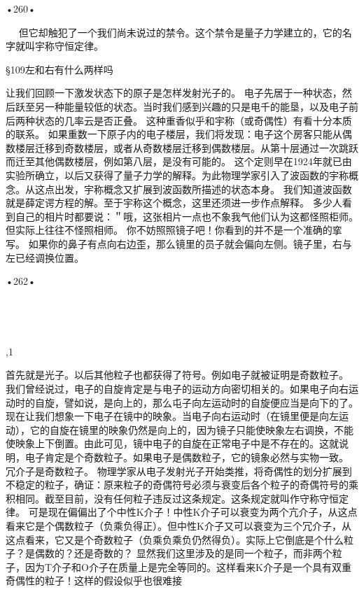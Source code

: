 •260•
  





  
但它却触犯了一个我们尚未说过的禁令。这个禁令是量子力学建立的，它的名字就叫宇称守恒定律。

§109左和右有什么两样吗

让我们回顾一下激发状态下的原子是怎样发射光子的。
电子先居于一种状态，然后跃至另一种能量较低的状态。当时我们感到兴趣的只是电千的能垦，以及电子前后两种状态的几率云是否正叠。
这种重香似乎和宇称（或奇偶性）有看十分本质的联系。
如果重数一下原子内的电子楼层，我们将发现：电子这个房客只能从偶数楼层迁移到奇数楼层，或者从奇数楼层迁移到偶数楼层。从第十层通过一次跳跃而迁至其他偶数楼层，例如第八层，是没有可能的。
这个定则早在1924年就已由实验所确立，以后又获得了量子力学的解释。为此物理学家引入了波函数的宇称概念。从这点出发，宇称概念又扩展到波函数所描述的状态本身。
我们知道波函数就是薛定谔方程的解。至于宇称这个概念，这里还须进一步作点解释。
多少人看到自己的相片时都要说：＂哦，这张相片一点也不象我气他们认为这都怪照柜师。但实际上往往不怪照相师。
你不妨照照镜子吧！你看到的并不是一个准确的挛写。
如果你的鼻子有点向右边歪，那么镜里的员子就会偏向左侧。镜子里，右与左已经调换位置。

•262•
  






  





  

,1
 
首先就是光子。以后其他粒子也都获得了符号。例如电子就被证明是奇数粒子。
我们曾经说过，电子的自旋肯定是与电子的运动方向密切相关的。如果电子向右运动时的自旋，譬如说，是向上的，那么屯子向左运动时的自旋便应当是向下的了。现在让我们想象一下电子在镜中的映象。当电子向右运动时（在镜里便是向左运动），它的自旋在镜里的映象仍然是向上的，因为镜子只能使映象左右调换，不能使映象上下倒置。由此可见，镜中电子的自旋在正常电子中是不存在的。这就说明，电子肯定是个奇数粒子。如果电子是偶数粒子，它的镜象必然与实物一致。
冗介子是奇数粒子。
物理学家从电子发射光子开始类推，将奇偶性的划分扩展到不稳定的粒子，确证：原来粒子的奇偶符号必须与衰变后各个粒子的奇偶符号的乘积相同。截至目前，没有任何粒子违反过这条规定。这条规定就叫作守称守恒定律。
可是现在偏偏出了个中性K介子！中性K介子可以衰变为两个亢介子，从这点看来它是个偶数粒子（负乘负得正）。但中性K介子又可以衰变为三个冗介子，从这点看来，它又是个奇数粒子（负乘负乘负仍然得负）。实际上它倒底是个什么粒子？是偶数的？还是奇数的？
显然我们这里涉及的是同一个粒子，而非两个粒子，因为T介子和O介子在质量上是完全等同的。这样看来K介子是一个具有双重奇偶性的粒子！这样的假设似乎也很难接

